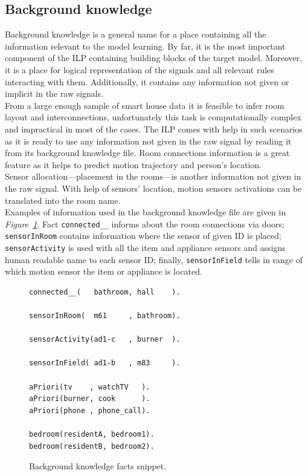 \documentclass[10pt, a4paper, pdflatex, leqno, twoside, openright]{report}
\begin{document}
    \subsection{Background knowledge\label{sec:data:bkg}}
Background knowledge is a general name for a place containing all the information relevant to the model learning. By far, it is the most important component of the ILP containing building blocks of the target model. Moreover, it is a place for logical representation of the signals and all relevant rules interacting with them. Additionally, it contains any information not given or implicit in the raw signals.\\

From a large enough sample of smart house data it is feasible to infer room layout and interconnections, unfortunately this task is computationally complex and impractical in most of the cases. The ILP comes with help in such scenarios as it is ready to use any information not given in the raw signal by reading it from its background knowledge file. Room connections information is a great feature as it helps to predict motion trajectory and person's location.\\
Sensor allocation---placement in the rooms---is another information not given in the raw signal. With help of sensors' location, motion sensors activations can be translated into the room name.\\
Examples of information used in the background knowledge file are given in \emph{Figure~\ref{lst:bg}}. Fact \texttt{connected\_\_} informs about the room connections via doors; \texttt{sensorInRoom} contains information where the sensor of given ID is placed; \texttt{sensorActivity} is used with all the item and appliance sensors and assigns human readable name to each sensor ID; finally, \texttt{sensorInField} tells in range of which motion sensor the item or appliance is located.\\

\begin{figure}[htb] %
  \begin{verbatim}
connected__(   bathroom, hall    ).

sensorInRoom(  m61     , bathroom).

sensorActivity(ad1-c   , burner  ).

sensorInField( ad1-b   , m83     ).

aPriori(tv    , watchTV   ).
aPriori(burner, cook      ).
aPriori(phone , phone_call).

bedroom(residentA, bedroom1).
bedroom(residentB, bedroom2).
  \end{verbatim}
  \caption{Background knowledge facts snippet.\label{lst:bg}}
\end{figure}
\end{document}
